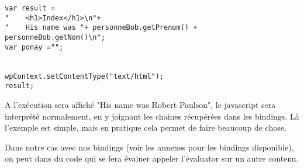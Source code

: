 \begin{lstlisting}
var result =
"    <h1>Index</h1>\n"+
"    His name was "+ personneBob.getPrenom() + personneBob.getNom()\n";
var ponay ="";


wpContext.setContentType("text/html");
result;
\end{lstlisting}



A l'exécution sera affiché "His name was Robert Paulson", le javascript sera interprété
normalement, en y joignant les chaines récupérées dans les bindings. Là l'exemple
est simple, mais en pratique cela permet de faire beaucoup de chose.

Dans notre cas avec nos bindings (voir les annexes pour les bindings disponible),
on peut dans du code qui se fera évaluer appeler l'évaluator sur un autre contenu.




